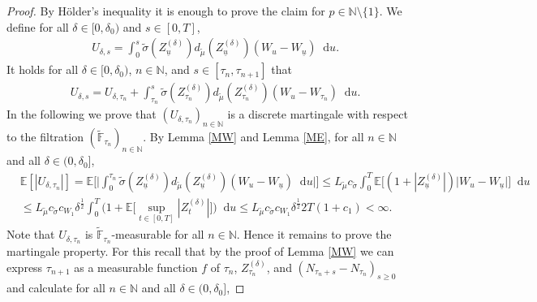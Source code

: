 \documentclass[10pt,a4paper]{amsart}
\newcommand{\E}{{\mathbb{E}}}
\newcommand{\N}{{\mathbb{N}}}
\newcommand{\diff}{\mathop{}\!\mathrm{d}}
\begin{document}
\begin{proof}
    By Hölder's inequality it is enough to prove the claim for $p\in\N\setminus \{1\}$.
    We define for all $\delta\in[0,\delta_0)$ and $s\in[0,T]$,
    \begin{equation}\label{M13}
        \begin{aligned}
        &U_{\delta,s} = \int_0^s  \widetilde\sigma(Z^{(\delta)}_{\underline u}) d_{\widetilde\mu}(Z^{(\delta)}_{\underline u}) (W_u-W_{\underline u})  \diff u.
        \end{aligned}
    \end{equation}
    It holds for all $\delta\in[0,\delta_0)$, $n\in\N$, and $s\in[\tau_n,\tau_{n+1}]$ that
    \begin{equation}\label{M14}
        \begin{aligned}
        &U_{\delta,s} =  U_{\delta,\tau_n} + \int_{\tau_n}^s \widetilde\sigma(Z^{(\delta)}_{\tau_n}) d_{\widetilde\mu}(Z^{(\delta)}_{\tau_n}) (W_u-W_{\tau_n}) \diff u.
        \end{aligned}
    \end{equation}
    In the following we prove that $(U_{\delta,\tau_n})_{n\in\N}$ is a discrete martingale with respect to the filtration $(\widetilde{\mathbb{F}}_{\tau_n})_{n\in\N}$. 
    By Lemma \ref{MW} and Lemma \ref{ME}, for all $n\in\N$ and all $\delta\in(0,\delta_0]$,
    \begin{equation}\label{M15}
        \begin{aligned}
        &\E[|U_{\delta,\tau_n}|] 
        = \E\Big[\Big| \int_0^{\tau_n}    \widetilde\sigma(Z^{(\delta)}_{\underline u}) d_{\widetilde\mu}(Z^{(\delta)}_{\underline u}) (W_u-W_{\underline u}) \diff u \Big|\Big]
        \leq L_{\widetilde\mu} c_{\widetilde\sigma} \int_0^{T} \E\Big[  (1+ |Z^{(\delta)}_{\underline u}|) \big| W_u-W_{\underline u}\big|\Big] \diff u \\
        &\leq L_{\widetilde\mu} c_{\widetilde\sigma}c_{W_1} \delta^{\frac{1}{2}} \int_0^{T} \Big( 1+ \E\Big[ \sup_{t\in[0,T]}|Z^{(\delta)}_{t}| \Big]\Big)\diff u 
        \leq L_{\widetilde\mu} c_{\widetilde\sigma}c_{W_1}  \delta^{\frac{1}{2}} 2T ( 1+ c_1) <\infty.
        \end{aligned}
    \end{equation}
    Note that $U_{\delta,\tau_n}$ is $\widetilde{\mathbb{F}}_{\tau_n}$-measurable for all $n\in\N$.
    Hence it remains to prove the martingale property. For this recall that by the proof of Lemma \ref{MW} we can express $\tau_{n+1}$ as a measurable function $f$ of $\tau_n$, $Z^{(\delta)}_{\tau_n}$, and $(N_{\tau_n+s} -N_{\tau_n})_{s\geq 0}$ and calculate for all $n\in\N$ and all $\delta\in(0,\delta_0]$,

\end{proof}
\end{document}
